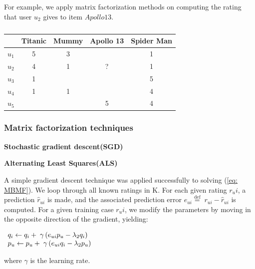 \documentclass[oneside,13pt]{extreport}
\begin{document}
For example, we apply matrix factorization methods on computing the rating that user $u_2$ gives to item $Apollo 13$. 
\begin{table}[h!]
    \small\centering
    \begin{tabular}{|c|c|c|c|c|}
        \hline
         & Titanic & Mummy & Apollo 13 & Spider Man \\
        \hline
        $u_1$ & 5 & 3 &  & 1 \\
        \hline
        $u_2$ & 4 & 1 & ? & 1 \\
        \hline
        $u_3$ & 1 &  &  & 5 \\
        \hline
        $u_4$ & 1 & 1 &  & 4 \\
        \hline
        $u_5$ &  &  & 5 & 4 \\
        \hline
    \end{tabular}
    \caption{}
\end{table}





\subsubsection{Matrix factorization techniques}
\begin{description}
    \item{\textbf{Stochastic gradient descent(SGD)}} 
    \item{\textbf{Alternating Least Squares(ALS)}}
\end{description}

A simple gradient descent technique was applied successfully to solving (\ref{eq: MBMF}).
We loop through all known ratings in K. For each given rating $r_ui$, a prediction $\hat r_{ui}$ is made, and the associated prediction error ${e_{ui}} \stackrel{\text{def}}{=} \;{r_{ui}} - \hat r_{ui}$ is computed. For a given training case $r_ui$, we modify the parameters by moving in the opposite direction of the gradient, yielding:

$\begin{array}{l}{q_i} \leftarrow {q_i} + {\rm{\;}}\gamma \left( {{e_{ui}}{p_u} - {\lambda _2}{q_i}} \right)\\{p_u} \leftarrow {p_u} + {\rm{\;}}\gamma \left( {{e_{ui}}{q_i} - {\lambda _2}{p_u}} \right)\end{array}
$

where $\gamma$ is the learning rate.
\end{document}
